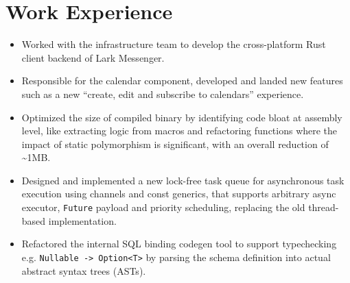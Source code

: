 \documentclass{resume}
\newcommand{\en}[1]{#1}
\newcommand{\zh}[1]{}
\begin{document}
\section{\en{Work Experience}\zh{工作经历}}
\en{}
\zh{\datedsubsection{\textbf{\href{https://www.bytedance.com/}{字节跳动}}}{2021/06 -- 2021/10}}
\en{}
\zh{\role{飞书基础架构}{Rust 研发实习}}
\begin{itemize}
      \item \en{Worked with the infrastructure team to develop the cross-platform Rust client backend of Lark Messenger.}
            \zh{合作开发飞书客户端的跨平台 Rust 框架。}
      \item \en{Responsible for the calendar component, developed and landed new features such as a new “create, edit and subscribe to calendars” experience.}
            \zh{负责日历组件，开发并上线新特性，如“创建、编辑和订阅日历”体验优化等。}
      \item \en{Optimized the size of compiled binary by identifying code bloat at assembly level, like extracting logic from macros and refactoring functions where the impact of static polymorphism is significant, with an overall reduction of \textasciitilde 1MB.}
            \zh{优化了编译二进制的大小。通过在汇编级别识别代码臃肿，如从宏中提取逻辑和重构受静态派发影响较大的函数，总体上将包体积减少了约 1MB。}
      \item \en{Designed and implemented a new lock-free task queue for asynchronous task execution using channels and const generics, that supports arbitrary async executor, \texttt{Future} payload and priority scheduling, replacing the old thread-based implementation.}
            \zh{设计并实现了一个新的无锁任务队列用于异步执行任务。其利用了 channel 和常量泛型（const generics），支持任意的异步执行器（executor）、 \texttt{Future} 载荷和优先级调度，取代了旧的基于线程的实现。}
      \item \en{Refactored the internal SQL binding codegen tool to support typechecking e.g. \texttt{Nullable -> Option<T>} by parsing the schema definition into actual abstract syntax trees (ASTs).}
            \zh{重构了内部 SQL 绑定代码的生成工具。通过将定义解析为实际的抽象语法树（AST）来支持类型检查，例如 \texttt{Nullable -> Option<T>}。}
\end{itemize}
\end{document}
